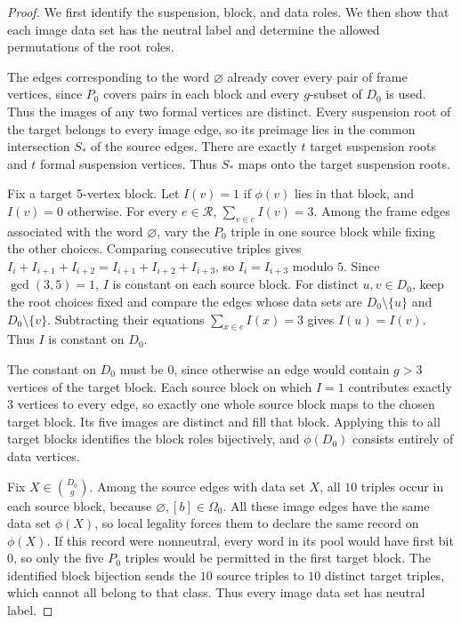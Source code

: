 \documentclass[10pt]{article}
\numberwithin{equation}{section}
\theoremstyle{definition}
\begin{document}
\begin{proof}
We first identify the suspension, block, and data roles. We then show that each image data set has the neutral label and determine the allowed permutations of the root roles.

The edges corresponding to the word $\varnothing$ already cover every pair of frame vertices, since $P_0$ covers pairs in each block and every $g$-subset of $D_0$ is used. Thus the images of any two formal vertices are distinct. Every suspension root of the target belongs to every image edge, so its preimage lies in the common intersection $S_*$ of the source edges. There are exactly $t$ target suspension roots and $t$ formal suspension vertices. Thus $S_*$ maps onto the target suspension roots.

Fix a target 5-vertex block. Let $I(v)=1$ if $\phi(v)$ lies in that block, and $I(v)=0$ otherwise. For every $e\in\mathscr R$, $\sum_{v\in e}I(v)=3$. Among the frame edges associated with the word $\varnothing$, vary the $P_0$ triple in one source block while fixing the other choices. Comparing consecutive triples gives $I_i+I_{i+1}+I_{i+2}=I_{i+1}+I_{i+2}+I_{i+3}$, so $I_i=I_{i+3}$ modulo $5$. Since $\gcd(3,5)=1$, $I$ is constant on each source block. For distinct $u,v\in D_0$, keep the root choices fixed and compare the edges whose data sets are $D_0\setminus\{u\}$ and $D_0\setminus\{v\}$. Subtracting their equations $\sum_{x\in e}I(x)=3$ gives $I(u)=I(v)$. Thus $I$ is constant on $D_0$.

The constant on $D_0$ must be $0$, since otherwise an edge would contain $g>3$ vertices of the target block. Each source block on which $I=1$ contributes exactly $3$ vertices to every edge, so exactly one whole source block maps to the chosen target block. Its five images are distinct and fill that block. Applying this to all target blocks identifies the block roles bijectively, and $\phi(D_0)$ consists entirely of data vertices.

Fix $X\in\binom{D_0}{g}$. Among the source edges with data set $X$, all $10$ triples occur in each source block, because $\varnothing,[b]\in\Omega_0$. All these image edges have the same data set $\phi(X)$, so local legality forces them to declare the same record on $\phi(X)$. If this record were nonneutral, every word in its pool would have first bit $0$, so only the five $P_0$ triples would be permitted in the first target block. The identified block bijection sends the $10$ source triples to $10$ distinct target triples, which cannot all belong to that class. Thus every image data set has neutral label.


\end{proof}
\end{document}
